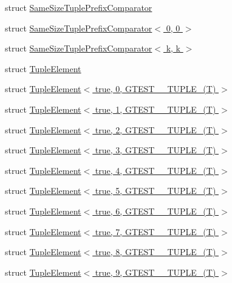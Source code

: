 \begin{DoxyCompactItemize}
\item 
struct \hyperlink{structstd_1_1tr1_1_1gtest__internal_1_1SameSizeTuplePrefixComparator}{Same\+Size\+Tuple\+Prefix\+Comparator}
\item 
struct \hyperlink{structstd_1_1tr1_1_1gtest__internal_1_1SameSizeTuplePrefixComparator_3_010_00_010_01_4}{Same\+Size\+Tuple\+Prefix\+Comparator$<$ 0, 0 $>$}
\item 
struct \hyperlink{structstd_1_1tr1_1_1gtest__internal_1_1SameSizeTuplePrefixComparator_3_01k_00_01k_01_4}{Same\+Size\+Tuple\+Prefix\+Comparator$<$ k, k $>$}
\item 
struct \hyperlink{structstd_1_1tr1_1_1gtest__internal_1_1TupleElement}{Tuple\+Element}
\item 
struct \hyperlink{structstd_1_1tr1_1_1gtest__internal_1_1TupleElement_3_01true_00_010_00_01GTEST__10__TUPLE___07T_08_01_4}{Tuple\+Element$<$ true, 0, G\+T\+E\+S\+T\+\_\+\_\+\+T\+U\+P\+L\+E\+\_\+(\+T) $>$}
\item 
struct \hyperlink{structstd_1_1tr1_1_1gtest__internal_1_1TupleElement_3_01true_00_011_00_01GTEST__10__TUPLE___07T_08_01_4}{Tuple\+Element$<$ true, 1, G\+T\+E\+S\+T\+\_\+\_\+\+T\+U\+P\+L\+E\+\_\+(\+T) $>$}
\item 
struct \hyperlink{structstd_1_1tr1_1_1gtest__internal_1_1TupleElement_3_01true_00_012_00_01GTEST__10__TUPLE___07T_08_01_4}{Tuple\+Element$<$ true, 2, G\+T\+E\+S\+T\+\_\+\_\+\+T\+U\+P\+L\+E\+\_\+(\+T) $>$}
\item 
struct \hyperlink{structstd_1_1tr1_1_1gtest__internal_1_1TupleElement_3_01true_00_013_00_01GTEST__10__TUPLE___07T_08_01_4}{Tuple\+Element$<$ true, 3, G\+T\+E\+S\+T\+\_\+\_\+\+T\+U\+P\+L\+E\+\_\+(\+T) $>$}
\item 
struct \hyperlink{structstd_1_1tr1_1_1gtest__internal_1_1TupleElement_3_01true_00_014_00_01GTEST__10__TUPLE___07T_08_01_4}{Tuple\+Element$<$ true, 4, G\+T\+E\+S\+T\+\_\+\_\+\+T\+U\+P\+L\+E\+\_\+(\+T) $>$}
\item 
struct \hyperlink{structstd_1_1tr1_1_1gtest__internal_1_1TupleElement_3_01true_00_015_00_01GTEST__10__TUPLE___07T_08_01_4}{Tuple\+Element$<$ true, 5, G\+T\+E\+S\+T\+\_\+\_\+\+T\+U\+P\+L\+E\+\_\+(\+T) $>$}
\item 
struct \hyperlink{structstd_1_1tr1_1_1gtest__internal_1_1TupleElement_3_01true_00_016_00_01GTEST__10__TUPLE___07T_08_01_4}{Tuple\+Element$<$ true, 6, G\+T\+E\+S\+T\+\_\+\_\+\+T\+U\+P\+L\+E\+\_\+(\+T) $>$}
\item 
struct \hyperlink{structstd_1_1tr1_1_1gtest__internal_1_1TupleElement_3_01true_00_017_00_01GTEST__10__TUPLE___07T_08_01_4}{Tuple\+Element$<$ true, 7, G\+T\+E\+S\+T\+\_\+\_\+\+T\+U\+P\+L\+E\+\_\+(\+T) $>$}
\item 
struct \hyperlink{structstd_1_1tr1_1_1gtest__internal_1_1TupleElement_3_01true_00_018_00_01GTEST__10__TUPLE___07T_08_01_4}{Tuple\+Element$<$ true, 8, G\+T\+E\+S\+T\+\_\+\_\+\+T\+U\+P\+L\+E\+\_\+(\+T) $>$}
\item 
struct \hyperlink{structstd_1_1tr1_1_1gtest__internal_1_1TupleElement_3_01true_00_019_00_01GTEST__10__TUPLE___07T_08_01_4}{Tuple\+Element$<$ true, 9, G\+T\+E\+S\+T\+\_\+\_\+\+T\+U\+P\+L\+E\+\_\+(\+T) $>$}
\end{DoxyCompactItemize}
